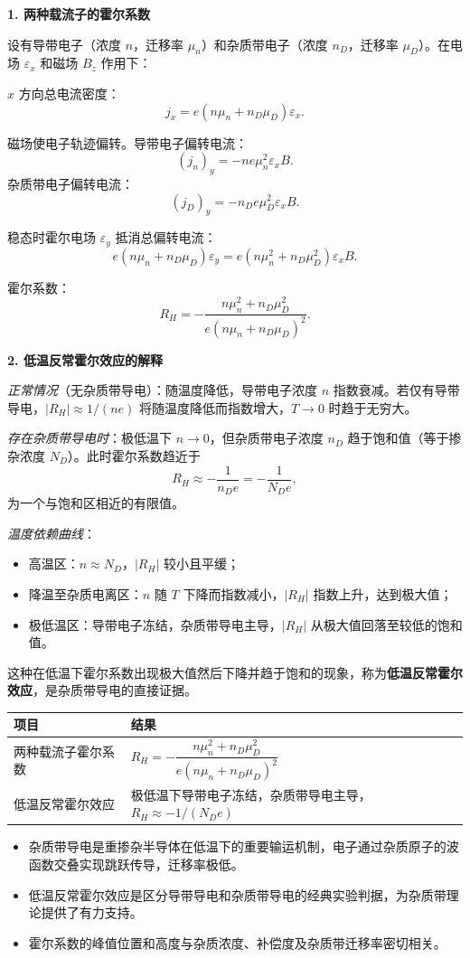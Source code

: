 \begin{derivationbox}[标准解题过程]
\textbf{1. 两种载流子的霍尔系数}

设有导带电子（浓度 $n$，迁移率 $\mu_n$）和杂质带电子（浓度 $n_D$，迁移率 $\mu_D$）。在电场 $\varepsilon_x$ 和磁场 $B_z$ 作用下：

$x$ 方向总电流密度：
\[
j_x=e(n\mu_n+n_D\mu_D)\varepsilon_x.
\]

磁场使电子轨迹偏转。导带电子偏转电流：
\[
(j_n)_y=-ne\mu_n^2\varepsilon_xB.
\]
杂质带电子偏转电流：
\[
(j_D)_y=-n_De\mu_D^2\varepsilon_xB.
\]

稳态时霍尔电场 $\varepsilon_y$ 抵消总偏转电流：
\[
e(n\mu_n+n_D\mu_D)\varepsilon_y=e(n\mu_n^2+n_D\mu_D^2)\varepsilon_xB.
\]

霍尔系数：
\begin{equation}
\boxed{R_H=-\frac{n\mu_n^2+n_D\mu_D^2}{e(n\mu_n+n_D\mu_D)^2}.}
\end{equation}

\textbf{2. 低温反常霍尔效应的解释}

\textit{正常情况}（无杂质带导电）：随温度降低，导带电子浓度 $n$ 指数衰减。若仅有导带导电，$|R_H|\approx1/(ne)$ 将随温度降低而指数增大，$T\to0$ 时趋于无穷大。

\textit{存在杂质带导电时}：极低温下 $n\to0$，但杂质带电子浓度 $n_D$ 趋于饱和值（等于掺杂浓度 $N_D$）。此时霍尔系数趋近于
\[
R_H\approx-\frac{1}{n_De}=-\frac{1}{N_De},
\]
为一个与饱和区相近的有限值。

\textit{温度依赖曲线}：
\begin{itemize}
    \item 高温区：$n\approx N_D$，$|R_H|$ 较小且平缓；
    \item 降温至杂质电离区：$n$ 随 $T$ 下降而指数减小，$|R_H|$ 指数上升，达到极大值；
    \item 极低温区：导带电子冻结，杂质带导电主导，$|R_H|$ 从极大值回落至较低的饱和值。
\end{itemize}

这种在低温下霍尔系数出现极大值然后下降并趋于饱和的现象，称为\textbf{低温反常霍尔效应}，是杂质带导电的直接证据。
\end{derivationbox}

\begin{formulabox}[答案汇总]
\begin{center}
\begin{tabular}{ll}
\toprule
\textbf{项目} & \textbf{结果} \\
\midrule
两种载流子霍尔系数 & $R_H=-\dfrac{n\mu_n^2+n_D\mu_D^2}{e(n\mu_n+n_D\mu_D)^2}$ \\
低温反常霍尔效应 & 极低温下导带电子冻结，杂质带导电主导，$R_H\approx-1/(N_De)$ \\
\bottomrule
\end{tabular}
\end{center}
\end{formulabox}

\begin{insightbox}[物理图像]
\begin{itemize}
    \item 杂质带导电是重掺杂半导体在低温下的重要输运机制，电子通过杂质原子的波函数交叠实现跳跃传导，迁移率极低。
    \item 低温反常霍尔效应是区分导带导电和杂质带导电的经典实验判据，为杂质带理论提供了有力支持。
    \item 霍尔系数的峰值位置和高度与杂质浓度、补偿度及杂质带迁移率密切相关。
\end{itemize}
\end{insightbox}
